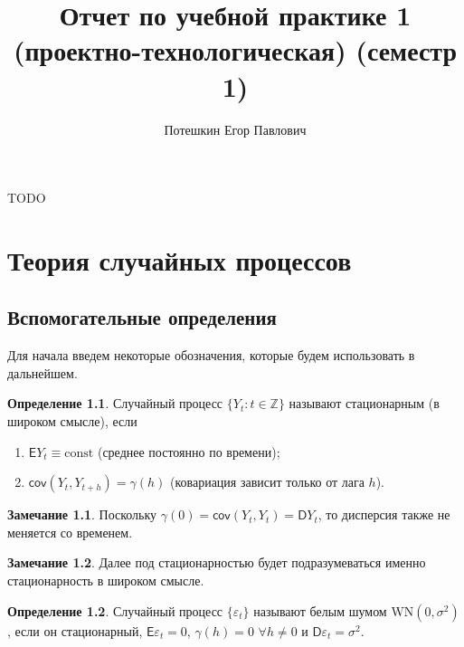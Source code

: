 \documentclass[specialist,
substylefile = spbu_report.rtx,
subf,href,colorlinks=true, 12pt]{disser}
\theoremstyle{definition}
\newtheorem{definition}{Определение}[section]
\newtheorem{remark}{Замечание}[section]
\newcommand{\Z}{\mathbb{Z}}
\newcommand{\const}{\mathrm{const}}
\begin{document}
%
%

\title{Отчет по учебной практике 1 (проектно-технологическая) (семестр 1)}

\topic{}

\author{Потешкин Егор Павлович}


\date{\number\year}

\maketitle

\tableofcontents

\intro
TODO

\chapter{Теория случайных процессов}
\section{Вспомогательные определения}
Для начала введем некоторые обозначения, которые будем использовать в дальнейшем.
\begin{definition}\label{def:stationary}
	Случайный процесс $\{Y_t:t\in\Z\}$ называют стационарным (в широком смысле), если
	\begin{enumerate}
		\item $\mathsf{E}Y_t\equiv\const$ (среднее постоянно по времени);
		\item $\mathsf{cov}(Y_t,Y_{t+h})=\gamma(h)$ (ковариация зависит только от лага $h$).
	\end{enumerate}
\end{definition}
\begin{remark}
	Поскольку $\gamma(0)=\mathsf{cov}(Y_t,Y_t)=\mathsf{D}Y_t$, то дисперсия также не меняется со временем.
\end{remark}
\begin{remark}
	Далее под стационарностью будет подразумеваться именно стационарность в широком смысле.
\end{remark}
\begin{definition}
	Случайный процесс $\{\varepsilon_t\}$ называют белым шумом $\mathrm{WN}(0, \sigma^2)$, если он стационарный, $\mathsf{E}\varepsilon_t=0$, $\gamma(h)=0$ $\forall h\ne 0$ и $\mathsf{D}\varepsilon_t=\sigma^2$.
\end{definition}
\end{document}
